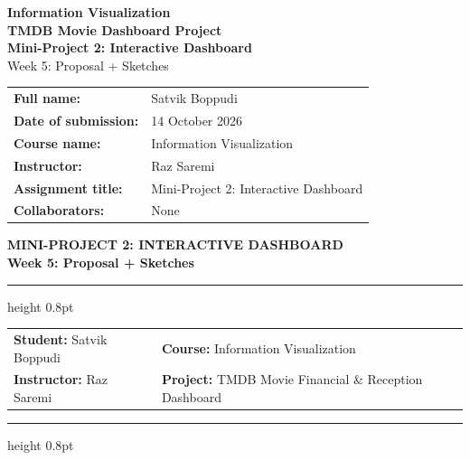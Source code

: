 \documentclass[10pt,a4paper]{article}
\begin{document}
\begin{titlepage}
    \vspace*{4.0cm}
    \begin{center}
        {\Large\bfseries Information Visualization}\\[1.6em]
        {\huge\bfseries TMDB Movie Dashboard Project}\\[0.8em]
        {\large\bfseries Mini-Project 2: Interactive Dashboard}\\[0.4em]
        {\normalsize Week 5: Proposal + Sketches}
    \end{center}

    \vspace{5.0cm}
    \begin{flushleft}
    \setlength{\tabcolsep}{12pt}
    \renewcommand{\arraystretch}{1.4}
    \begin{tabular}{ll}
        \textbf{Full name:} & Satvik Boppudi \\
        \textbf{Date of submission:} & 14 October 2026 \\
        \textbf{Course name:} & Information Visualization \\
        \textbf{Instructor:} & Raz Saremi \\
        \textbf{Assignment title:} & Mini-Project 2: Interactive Dashboard \\
        \textbf{Collaborators:} & None \\
    \end{tabular}
    \end{flushleft}
    \vspace*{2.0cm}
\end{titlepage}

\begin{center}
    {\Large\bfseries MINI-PROJECT 2: INTERACTIVE DASHBOARD}\\[0.2em]
    {\normalsize\bfseries Week 5: Proposal + Sketches}\\[0.4em]
    \hrule height 0.8pt
    \vspace{0.25em}
    \begin{tabular*}{\textwidth}{@{\extracolsep{\fill}}ll}
        \textbf{Student:} Satvik Boppudi & \textbf{Course:} Information Visualization \\
        \textbf{Instructor:} Raz Saremi & \textbf{Project:} TMDB Movie Financial \& Reception Dashboard \\
    \end{tabular*}
    \vspace{0.25em}
    \hrule height 0.8pt
\end{center}
\end{document}
